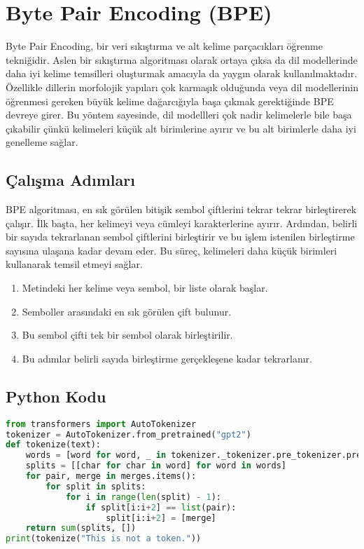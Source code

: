 \section{Byte Pair Encoding (BPE)}

Byte Pair Encoding, bir veri sıkıştırma ve alt kelime parçacıkları öğrenme tekniğidir. Aslen bir sıkıştırma algoritması olarak ortaya çıksa da dil modellerinde daha iyi kelime temsilleri oluşturmak amacıyla da yaygın olarak kullanılmaktadır. Özellikle dillerin morfolojik yapıları çok karmaşık olduğunda veya dil modellerinin öğrenmesi gereken büyük kelime dağarcığıyla başa çıkmak gerektiğinde BPE devreye girer. Bu yöntem sayesinde, dil modellleri çok nadir kelimelerle bile başa çıkabilir çünkü kelimeleri küçük alt birimlerine ayırır ve bu alt birimlerle daha iyi genelleme sağlar. 

\subsection{Çalışma Adımları}

BPE algoritması, en sık görülen bitişik sembol çiftlerini tekrar tekrar birleştirerek çalışır. İlk başta, her kelimeyi veya cümleyi karakterlerine ayırır. Ardından, belirli bir sayıda tekrarlanan sembol çiftlerini birleştirir ve bu işlem istenilen birleştirme sayısına ulaşana kadar devam eder. Bu süreç, kelimeleri daha küçük birimleri kullanarak temsil etmeyi sağlar.

\begin{enumerate}
    \item Metindeki her kelime veya sembol, bir liste olarak başlar.
    \item Semboller arasındaki en sık görülen çift bulunur.
    \item Bu sembol çifti tek bir sembol olarak birleştirilir.
    \item Bu adımlar belirli sayıda birleştirme gerçekleşene kadar tekrarlanır.
\end{enumerate}

\subsection{Python Kodu}

\begin{lstlisting}[language=Python]
from transformers import AutoTokenizer
tokenizer = AutoTokenizer.from_pretrained("gpt2")
def tokenize(text):
    words = [word for word, _ in tokenizer._tokenizer.pre_tokenizer.pre_tokenize_str(text)]
    splits = [[char for char in word] for word in words]
    for pair, merge in merges.items():
        for split in splits:
            for i in range(len(split) - 1):
                if split[i:i+2] == list(pair):
                    split[i:i+2] = [merge]
    return sum(splits, [])
print(tokenize("This is not a token."))  
\end{lstlisting}

\newpage